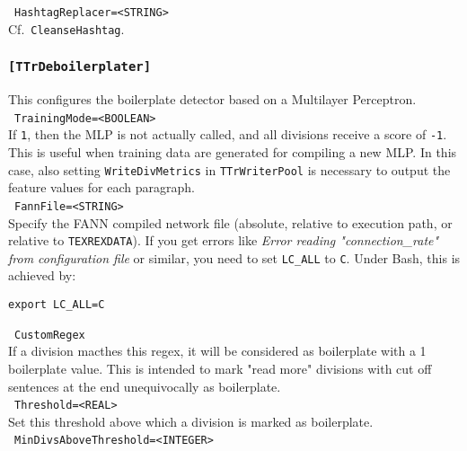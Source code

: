 \documentclass[12pt,a4paper]{article}
\begin{document}
\noindent\textbullet~\texttt{HashtagReplacer=<STRING>}\\

Cf.\ \texttt{CleanseHashtag}.\\


\subsubsection{\texttt{[TTrDeboilerplater]}}
\label{sec:deboilerplater}

This configures the boilerplate detector based on a Multilayer Perceptron.\\

\noindent\textbullet~\texttt{TrainingMode=<BOOLEAN>}\\

If \texttt{1}, then the MLP is not actually called, and all divisions receive a score of \texttt{-1}.
This is useful when training data are generated for compiling a new MLP.
In this case, also setting \texttt{WriteDivMetrics} in \texttt{TTrWriterPool} is necessary to output the feature values for each paragraph.\\

\noindent\textbullet~\texttt{FannFile=<STRING>}\\

Specify the FANN compiled network file (absolute, relative to execution path, or relative to \texttt{TEXREXDATA}).
If you get errors like \textit{Error reading "connection\_rate" from configuration file} or similar, you need to set \texttt{LC\_ALL} to \texttt{C}.
Under Bash, this is achieved by:

\begin{center}
  \texttt{export LC\_ALL=C}
\end{center}

\noindent\textbullet~\texttt{CustomRegex}\\

If a division macthes this regex, it will be considered as boilerplate with a 1 boilerplate value.
This is intended to mark "read more" divisions with cut off sentences at the end unequivocally as boilerplate.\\

\noindent\textbullet~\texttt{Threshold=<REAL>}\\

Set this threshold above which a division is marked as boilerplate.\\

\noindent\textbullet~\texttt{MinDivsAboveThreshold=<INTEGER>}\\
\end{document}
